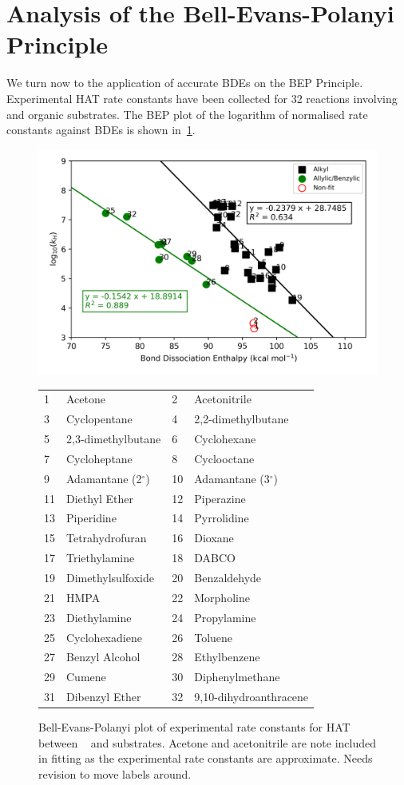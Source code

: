 \section{Analysis of the Bell-Evans-Polanyi Principle}

We turn now to the application of accurate BDEs on the BEP Principle. Experimental HAT rate constants have been collected for 32 reactions involving \cumo and organic substrates. The BEP plot of the logarithm of normalised rate constants against BDEs is shown in~\ref{fig:bde-bep}.

\begin{figure}[htb]
  \centering
  \includegraphics[width=\textwidth]{figures/bde-bep}
\begin{tabularx}{\textwidth}{| l X l X |}
  \hline
  1 & Acetone & 2 & Acetonitrile \\
  3 & Cyclopentane & 4 & 2,2-dimethylbutane \\
  5 & 2,3-dimethylbutane & 6 & Cyclohexane \\
  7 & Cycloheptane & 8 & Cyclooctane \\
  9 & Adamantane (2$^\circ$) & 10 & Adamantane (3$^\circ$) \\
  11 & Diethyl Ether & 12 & Piperazine \\
  13 & Piperidine & 14 & Pyrrolidine \\
  15 & Tetrahydrofuran & 16 & Dioxane \\
  17 & Triethylamine & 18 & DABCO \\
  19 & Dimethylsulfoxide & 20 & Benzaldehyde \\
  21 & HMPA & 22 & Morpholine \\
  23 & Diethylamine & 24 & Propylamine \\
  25 & Cyclohexadiene & 26 & Toluene \\
  27 & Benzyl Alcohol & 28 & Ethylbenzene \\
  29 & Cumene & 30 & Diphenylmethane \\
  31 & Dibenzyl Ether & 32 & 9,10-dihydroanthracene \\
  \hline
\end{tabularx}
  \caption{Bell-Evans-Polanyi plot of experimental rate constants for HAT between \cumo~ and substrates. Acetone and acetonitrile are note included in fitting as the experimental rate constants are approximate. Needs revision to move labels around.}
\label{fig:bde-bep}
\end{figure}

